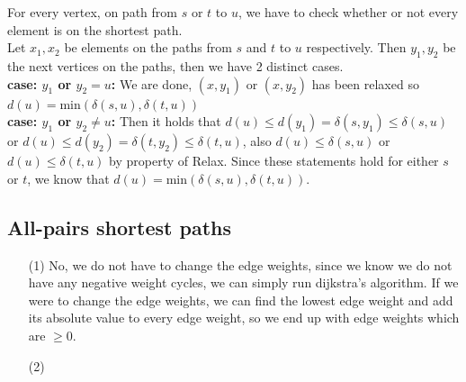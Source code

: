\documentclass{article}
\begin{document}
\begin{itemize}
\begin{itemize}
For every vertex, on path from $s$ or $t$ to $u$, we have to check whether or not every element is on the shortest path. \\

Let $x_1,x_2$ be elements on the paths from $s$ and $t$ to $u$ respectively. Then $y_1,y_2$ be the next vertices on the paths, then we have 2 distinct cases. \\

\textbf{case: $y_1$ or $y_2 = u$:} We are done, $(x,y_1)$ or $(x,y_2)$ has been relaxed so $d(u)=$min$(\delta(s,u),\delta(t,u))$ \\

\textbf{case: $y_1$ or $y_2 \ne u$:} 
Then it holds that $d(u) \le d(y_1) = \delta(s,y_1) \le \delta(s,u)$ or $d(u) \le d(y_2) = \delta(t,y_2) \le \delta(t,u)$, also $d(u) \le \delta(s,u)$ or $d(u) \le \delta(t,u)$ by property of Relax. Since these statements hold for either $s$ or $t$, we know that $d(u)=\text{min}(\delta(s,u),\delta(t,u))$.

\end{itemize}
\end{itemize}

\subsection*{All-pairs shortest paths}
\begin{itemize}
\item[(1)] No, we do not have to change the edge weights, since we know we do not have any negative weight cycles, we can simply run dijkstra's algorithm. If we were to change the edge weights, we can find  the lowest edge weight and add its absolute value to every edge weight, so we end up with edge weights which are $\ge 0$.

\item[(2)]
\begin{algorithmic}[1]
\RETURN{\TRUE}
\ENDIF
\ENDFOR
\ENDFOR
\RETURN{\FALSE}
\end{algorithmic} 
\bigskip
\begin{algorithmic}[1]
 \RETURN{\FALSE}\ENDIF
{} \RETURN{\TRUE}\ENDIF
{}
\RETURN{\TRUE}
\ENDIF
\ENDFOR
\RETURN{\FALSE}
\end{algorithmic}

\end{itemize}
\end{document}
